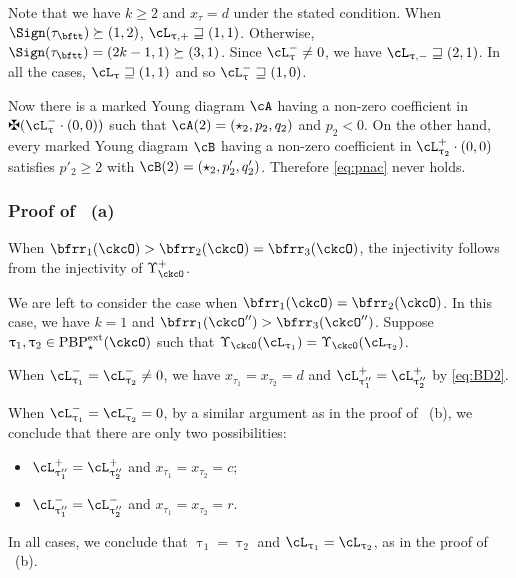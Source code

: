 \documentclass[12pt,a4paper]{amsart}
\numberwithin{equation}{section}
\theoremstyle{remark}
\def\PBPes{\mathrm{PBP}^{\mathrm{ext}}_{\star}}
\def\PBP{\mathrm{PBP}}
\begin{document}
  Note that we have $k\geq 2$ and $x_{\tau}=d$ under the stated condition.
  When $\Sign( {\tau}_{\bftt} )\succeq (1,2)$, $\ppac{\uptau}\sqsupseteq (1,1)$.
  Otherwise, $\Sign( \tau_{\bftt} ) = (2k-1,1)\succeq (3,1)$.
  Since $\nac{\uptau}\neq 0$, we have $\nnac{\uptau}\sqsupseteq (2,1)$.
  In all the cases,  $\ac_{\uptau}\sqsupseteq (1,1)$ and so
  $\nac{\uptau}\sqsupseteq (1,0)$.

  Now there is a marked Young diagram $\cA$ having a non-zero coefficient in
  $\maltese (\nac{\uptau}\cdot (0,0))$ such that $\cA(2) = (\star_2, p_2, q_2)$
  and $p_2<0$.
  On the other hand, every marked Young diagram $\cB$ having
  a non-zero coefficient in $\pac{\uptau_2}\cdot(0,0)$ satisfies $p'_2\geq 2$
  with $\cB(2) = (\star_2, p'_2,q'_2)$.
  Therefore \eqref{eq:pnac} never holds.


\subsubsection*{Proof of ~(a)}

When $\bfrr_{1}(\ckcO)>\bfrr_{2}(\ckcO)=\bfrr_{3}(\ckcO)$, the injectivity
follows from the injectivity of $\Upsilon_{\ckcO}^{+}$.

We are left to consider the case when $\bfrr_{1}(\ckcO)=\bfrr_{2}(\ckcO)$.
In this case, we have $k=1$ and $\bfrr_{1}(\ckcO'')>\bfrr_{3}(\ckcO'')$.
Suppose $\uptau_1, \uptau_2\in \PBPes(\ckcO)$ such that
$\Upsilon_{\ckcO}(\ac_{\uptau_{1}}) = \Upsilon_{\ckcO}(\ac_{\uptau_{2}})$.

When $\nac{\uptau_{1}}=\nac{\uptau_{2}}  \neq 0$, we have $x_{\tau_{1}}=x_{\tau_{2}}=d$ and
$\pac{\uptau''_{1}} = \pac{\uptau''_{2}}$ by \eqref{eq:BD2}.

When $\nac{\uptau_{1}}=\nac{\uptau_{2}}=0$, by a similar argument as in the proof of ~(b),
we conclude that there are only two possibilities:
\begin{itemize}
  \item $\pac{\uptau''_{1}} = \pac{\uptau''_{2}}$ and
  $x_{\tau_{1}}=x_{\tau_{2}} = c$;
  \item $\nac{\uptau''_{1}} = \nac{\uptau''_{2}}$ and
  $x_{\tau_{1}}=x_{\tau_{2}} = r$.
\end{itemize}

In all cases,
we conclude that $\uptau_1=\uptau_2$ and $\ac_{\uptau_1} = \ac_{\uptau_2}$,
as in the proof of ~(b).
\end{document}
